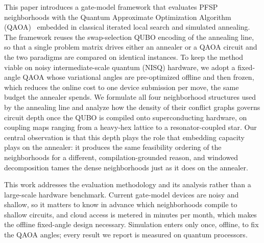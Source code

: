 \documentclass{svproc}
\newcommand{\rev}[1]{{\color{blue}#1}}
\newcommand{\rev}[1]{#1}
\begin{document}
This paper introduces a gate-model framework that evaluates PFSP
neighborhoods with the Quantum Approximate Optimization Algorithm
(QAOA)~\cite{farhi2014qaoa} embedded in classical iterated local search
and simulated annealing. The framework reuses the swap-selection QUBO
encoding of the annealing line, so that a single problem matrix drives
either an annealer or a QAOA circuit and the two paradigms are compared
on identical instances. To keep the method viable on noisy
intermediate-scale \rev{quantum (NISQ)} hardware, we adopt a fixed-angle QAOA whose
variational angles are pre-optimized offline and then frozen, which reduces
the online cost to one device submission per move, the same budget the
annealer spends. We formulate all four neighborhood structures used by
the annealing line and analyze how the density of their conflict graphs
governs circuit depth once the QUBO is compiled onto superconducting
hardware, on coupling maps ranging from a heavy-hex lattice to a
resonator-coupled star. Our central observation is that this depth
plays the role that embedding capacity plays on the annealer: it
produces the same feasibility ordering of the neighborhoods for a
different, compilation-grounded reason, and windowed decomposition tames
the dense neighborhoods just as it does on the annealer.

This work addresses the evaluation methodology and its analysis rather
than a large-scale hardware benchmark. Current gate-model devices are noisy
and shallow, so it matters to know in advance which neighborhoods compile to
shallow circuits, and cloud access is metered in minutes per month, which
makes the offline fixed-angle design necessary. Simulation enters
only once, offline, to fix the QAOA angles; every result we report is
measured on quantum processors.

\end{document}
